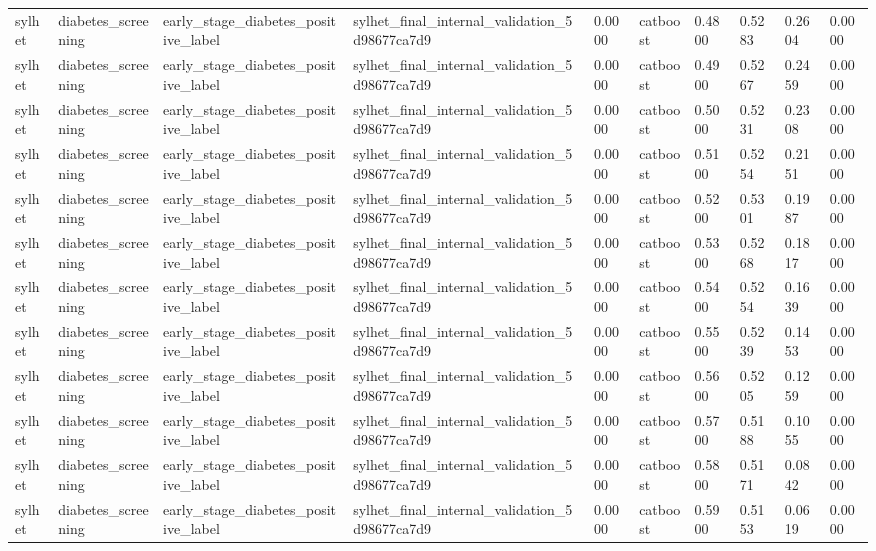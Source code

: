 \begin{tabular}{llllllllll}
sylhet & diabetes\_screening & early\_stage\_diabetes\_positive\_label & sylhet\_final\_internal\_validation\_5d98677ca7d9 & 0.0000 & catboost & 0.4800 & 0.5283 & 0.2604 & 0.0000 \\
sylhet & diabetes\_screening & early\_stage\_diabetes\_positive\_label & sylhet\_final\_internal\_validation\_5d98677ca7d9 & 0.0000 & catboost & 0.4900 & 0.5267 & 0.2459 & 0.0000 \\
sylhet & diabetes\_screening & early\_stage\_diabetes\_positive\_label & sylhet\_final\_internal\_validation\_5d98677ca7d9 & 0.0000 & catboost & 0.5000 & 0.5231 & 0.2308 & 0.0000 \\
sylhet & diabetes\_screening & early\_stage\_diabetes\_positive\_label & sylhet\_final\_internal\_validation\_5d98677ca7d9 & 0.0000 & catboost & 0.5100 & 0.5254 & 0.2151 & 0.0000 \\
sylhet & diabetes\_screening & early\_stage\_diabetes\_positive\_label & sylhet\_final\_internal\_validation\_5d98677ca7d9 & 0.0000 & catboost & 0.5200 & 0.5301 & 0.1987 & 0.0000 \\
sylhet & diabetes\_screening & early\_stage\_diabetes\_positive\_label & sylhet\_final\_internal\_validation\_5d98677ca7d9 & 0.0000 & catboost & 0.5300 & 0.5268 & 0.1817 & 0.0000 \\
sylhet & diabetes\_screening & early\_stage\_diabetes\_positive\_label & sylhet\_final\_internal\_validation\_5d98677ca7d9 & 0.0000 & catboost & 0.5400 & 0.5254 & 0.1639 & 0.0000 \\
sylhet & diabetes\_screening & early\_stage\_diabetes\_positive\_label & sylhet\_final\_internal\_validation\_5d98677ca7d9 & 0.0000 & catboost & 0.5500 & 0.5239 & 0.1453 & 0.0000 \\
sylhet & diabetes\_screening & early\_stage\_diabetes\_positive\_label & sylhet\_final\_internal\_validation\_5d98677ca7d9 & 0.0000 & catboost & 0.5600 & 0.5205 & 0.1259 & 0.0000 \\
sylhet & diabetes\_screening & early\_stage\_diabetes\_positive\_label & sylhet\_final\_internal\_validation\_5d98677ca7d9 & 0.0000 & catboost & 0.5700 & 0.5188 & 0.1055 & 0.0000 \\
sylhet & diabetes\_screening & early\_stage\_diabetes\_positive\_label & sylhet\_final\_internal\_validation\_5d98677ca7d9 & 0.0000 & catboost & 0.5800 & 0.5171 & 0.0842 & 0.0000 \\
sylhet & diabetes\_screening & early\_stage\_diabetes\_positive\_label & sylhet\_final\_internal\_validation\_5d98677ca7d9 & 0.0000 & catboost & 0.5900 & 0.5153 & 0.0619 & 0.0000 \\

\end{tabular}
